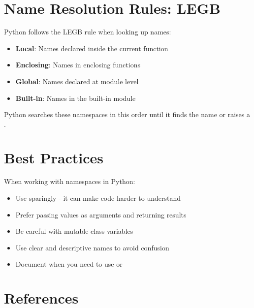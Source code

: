 \section{Name Resolution Rules: LEGB}

Python follows the LEGB rule when looking up names:

\begin{itemize}
    \item \textbf{Local}: Names declared inside the current function
    \item \textbf{Enclosing}: Names in enclosing functions
    \item \textbf{Global}: Names declared at module level
    \item \textbf{Built-in}: Names in the built-in module
\end{itemize}

Python searches these namespaces in this order until it finds the name or raises a .

\section{Best Practices}

When working with namespaces in Python:

\begin{itemize}
    \item Use  sparingly - it can make code harder to understand
    \item Prefer passing values as arguments and returning results
    \item Be careful with mutable class variables
    \item Use clear and descriptive names to avoid confusion
    \item Document when you need to use  or 
\end{itemize}

\section{References}

